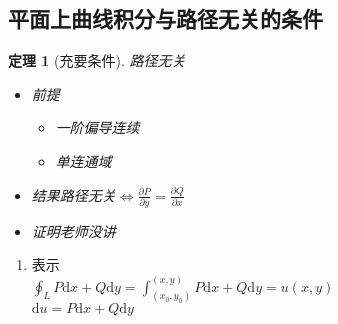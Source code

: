 \documentclass[UTF8,a4paper,12pt,scheme=chinese]{ctexbook}
\newcommand{\ud}{\mathrm{d}}
\newtheorem{theorem}{定理}[section]
\theoremstyle{plain}
\begin{document}
	\subsection{平面上曲线积分与路径无关的条件}
	\begin{theorem}[充要条件]路径无关
		\begin{itemize}
			\item 前提
			\begin{itemize}
				\item 一阶偏导连续
				\item 单连通域
			\end{itemize}
			\item 结果\quad 路径无关$\Leftrightarrow$$\frac{{\partial P}}{{\partial y}} = \frac{{\partial Q}}{{\partial x}}$
			\item 证明\quad 老师没讲
		\end{itemize}
	\end{theorem}
\begin{enumerate}
	\item 表示 \\$
	\oint_{L}P\ud x + Q \ud y
	=
	\int_{(x_{0},y_{0})}^{(x,y)}P\ud x + Q \ud y
	=
	u(x,y)
	$\\
	$
	\ud u = P\ud x + Q \ud y
	$
	
\end{enumerate}
\end{document}
